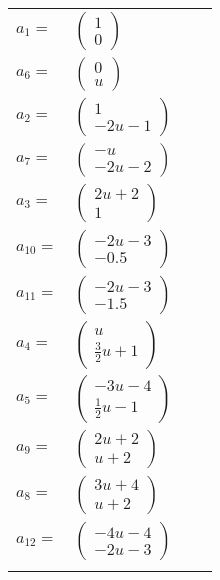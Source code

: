 \documentclass[1p]{elsarticle_modified}
\theoremstyle{definition}
\begin{document}
\begin{tabular}{m{7pt} m{180pt} m{7pt} m{180pt} }
\flushright $a_{1}=$&$\begin{pmatrix}1\\0\end{pmatrix}$ \\
\flushright $a_{6}=$&$\begin{pmatrix}0\\u\end{pmatrix}$ \\
\flushright $a_{2}=$&$\begin{pmatrix}1\\-2 u-1\end{pmatrix}$ \\
\flushright $a_{7}=$&$\begin{pmatrix}- u\\-2 u-2\end{pmatrix}$ \\
\flushright $a_{3}=$&$\begin{pmatrix}2 u+2\\1\end{pmatrix}$ \\
\flushright $a_{10}=$&$\begin{pmatrix}-2 u-3\\-0.5\end{pmatrix}$ \\
\flushright $a_{11}=$&$\begin{pmatrix}-2 u-3\\-1.5\end{pmatrix}$ \\
\flushright $a_{4}=$&$\begin{pmatrix}u\\\frac{3}{2} u+1\end{pmatrix}$ \\
\flushright $a_{5}=$&$\begin{pmatrix}-3 u-4\\\frac{1}{2} u-1\end{pmatrix}$ \\
\flushright $a_{9}=$&$\begin{pmatrix}2 u+2\\u+2\end{pmatrix}$ \\
\flushright $a_{8}=$&$\begin{pmatrix}3 u+4\\u+2\end{pmatrix}$ \\
\flushright $a_{12}=$&$\begin{pmatrix}-4 u-4\\-2 u-3\end{pmatrix}$\\&\end{tabular}
\end{document}
